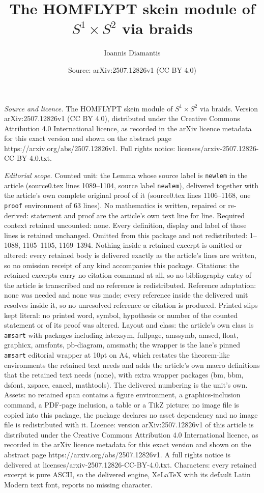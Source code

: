 \documentclass[10pt,a4paper]{amsart}
\title[The HOMFLYPT skein module of $S^1 \times S^2$ via braids]{The HOMFLYPT skein module of $S^1 \times S^2$ via braids}
\author{Ioannis Diamantis}
\date{Source: arXiv:2507.12826v1 (CC BY 4.0)}
\begin{document}
\maketitle

\noindent\emph{Source and licence.} The HOMFLYPT skein module of $S^1 \times S^2$ via braids. Version arXiv:2507.12826v1 (CC BY 4.0), distributed under the Creative Commons Attribution 4.0 International licence, as recorded in the arXiv licence metadata for this exact version and shown on the abstract page https://arxiv.org/abs/2507.12826v1. Full rights notice: licenses/arxiv-2507.12826-CC-BY-4.0.txt.\par\smallskip

\noindent\textit{Editorial scope.} Counted unit: the Lemma whose source label is \texttt{newlem} in the article (source0.tex lines 1089--1104, source label \texttt{newlem}), delivered together with the article's own complete original proof of it (source0.tex lines 1106--1168, one \texttt{proof} environment of 63 lines). No mathematics is written, repaired or re-derived: statement and proof are the article's own text line for line. Required context retained uncounted: none. Every definition, display and label of those lines is retained unchanged. Omitted from this package and not redistributed: 1--1088, 1105--1105, 1169--1394. Nothing inside a retained excerpt is omitted or altered: every retained body is delivered exactly as the article's lines are written, so no omission receipt of any kind accompanies this package. Citations: the retained excerpts carry no citation command at all, so no bibliography entry of the article is transcribed and no reference is redistributed. Reference adaptation: none was needed and none was made; every reference inside the delivered unit resolves inside it, so no unresolved reference or citation is produced. Printed slips kept literal: no printed word, symbol, hypothesis or number of the counted statement or of its proof was altered. Layout and class: the article's own class is \texttt{amsart} with packages including latexsym, fullpage, amssymb, amscd, float, graphicx, amsfonts, pb-diagram, amsmath; the wrapper is the lane's pinned \texttt{amsart} editorial wrapper at 10pt on A4, which restates the theorem-like environments the retained text needs and adds the article's own macro definitions that the retained text needs (none), with extra wrapper packages (bm, bbm, dsfont, xspace, cancel, mathtools). The delivered numbering is the unit's own. Assets: no retained span contains a figure environment, a graphics-inclusion command, a PDF-page inclusion, a table or a TikZ picture; no image file is copied into this package, the package declares no asset dependency and no image file is redistributed with it. Licence: version arXiv:2507.12826v1 of this article is distributed under the Creative Commons Attribution 4.0 International licence, as recorded in the arXiv licence metadata for this exact version and shown on the abstract page https://arxiv.org/abs/2507.12826v1. A full rights notice is delivered at licenses/arxiv-2507.12826-CC-BY-4.0.txt. Characters: every retained excerpt is pure ASCII, so the delivered engine, XeLaTeX with its default Latin Modern text font, reports no missing character.
\end{document}
